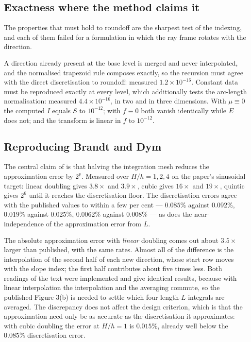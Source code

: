 \documentclass[11pt]{article}
\begin{document}
\subsection{Exactness where the method claims it}
\label{sec:exact}

The properties that must hold to roundoff are the sharpest test of the
indexing, and each of them failed for a formulation in which the ray frame
rotates with the direction.

A direction already present at the base level is merged and never interpolated,
and the normalised trapezoid rule composes exactly, so the recursion must agree
with the direct discretisation to roundoff: measured $1.2\times10^{-16}$.
Constant data must be reproduced exactly at every level, which additionally
tests the arc-length normalisation: measured $4.4\times10^{-16}$, in two and in
three dimensions. With $\mu\equiv0$ the computed $I$ equals $S$ to
$10^{-12}$; with $f\equiv0$ both vanish identically while $E$ does not; and the
transform is linear in $f$ to $10^{-12}$.

\subsection{Reproducing Brandt and Dym}
\label{sec:reproduce}

The central claim of \citep{brandtdym1999} is that halving the integration mesh
reduces the approximation error by $2^p$. Measured over $H/h = 1,2,4$ on the
paper's sinusoidal target: linear doubling gives $3.8\times$ and $3.9\times$,
cubic gives $16\times$ and $19\times$, quintic gives $2^6$ until it reaches the
discretisation floor. The discretisation errors agree with the published values
to within a few per cent --- $0.085\%$ against $0.092\%$, $0.019\%$ against
$0.025\%$, $0.0062\%$ against $0.008\%$ --- as does the near-independence of the
approximation error from $L$.

The absolute approximation error with \emph{linear} doubling comes out about
$3.5\times$ larger than published, with the same rates. Almost all of the
difference is the interpolation of the second half of each new direction, whose
start row moves with the slope index; the first half contributes about five
times less. Both readings of the text were implemented and give identical
results, because with linear interpolation the interpolation and the averaging
commute, so the published Figure 3(b) is needed to settle which four length-$L$
integrals are averaged. The discrepancy does not affect the design criterion,
which is that the approximation need only be as accurate as the discretisation
it approximates: with cubic doubling the error at $H/h=1$ is $0.015\%$, already
well below the $0.085\%$ discretisation error.
\end{document}
